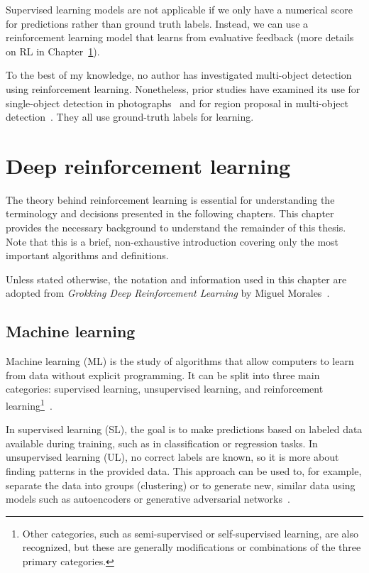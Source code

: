 \documentclass[
  digital,     %
  oneside,     %
  nosansbold,  %
  nocolorbold, %
  lof,         %
  lot,         %
]{fithesis4}
\begin{document}
Supervised learning models are not applicable if we only have a numerical score for predictions rather than ground truth labels. Instead, we can use a reinforcement learning model that learns from evaluative feedback (more details on RL in Chapter~\ref{ch:dlr}).

To the best of my knowledge, no author has investigated multi-object detection using reinforcement learning. Nonetheless, prior studies have examined its use for single-object detection in photographs~\cite{iterative_od_with_rl, hierarchical_od_with_drl} and for region proposal in multi-object detection~\cite{drl_rpn}. They all use ground-truth labels for learning.

\chapter{Deep reinforcement learning}
\label{ch:dlr}

The theory behind reinforcement learning is essential for understanding the terminology and decisions presented in the following chapters. This chapter provides the necessary background to understand the remainder of this thesis. Note that this is a brief, non-exhaustive introduction covering only the most important algorithms and definitions.

Unless stated otherwise, the notation and information used in this chapter are adopted from \textit{Grokking Deep Reinforcement Learning} by Miguel Morales~\cite{GDRL}.

\section{Machine learning}
Machine learning (ML) is the study of algorithms that allow computers to learn from data without explicit programming. It can be split into three main categories: supervised learning, unsupervised learning, and reinforcement learning\footnote{Other categories, such as semi-supervised or self-supervised learning, are also recognized, but these are generally modifications or combinations of the three primary categories.}~\cite{IB031}.

In supervised learning (SL), the goal is to make predictions based on labeled data available during training, such as in classification or regression tasks. In unsupervised learning (UL), no correct labels are known, so it is more about finding patterns in the provided data. This approach can be used to, for example, separate the data into groups (clustering) or to generate new, similar data using models such as autoencoders or generative adversarial networks~\cite{IB031, PV021}.
\end{document}

